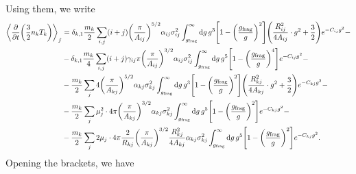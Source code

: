 \documentclass[aps,prl,preprint,groupedaddress,10pt]{revtex4-2}
\begin{document}
Using them, we write
\begin{equation}
    \begin{split}
        \avg{\pdv{t}\pqty{\frac{3}{2}n_kT_k}}_f&=\delta_{k,1}\frac{m_k}{2}
        \sum_{i,j}(i+j)\pqty{\frac{\pi}{A_{ij}}}^{5/2}\alpha_{ij}\sigma_{ij}^2
        \int_{\ltx{g}{frag}}^{\infty}
        \dd{g}g^3\bqty{1-\pqty{\frac{\ltx{g}{frag}}{g}}^2}
        \pqty{\frac{R_{ij}^2}{4A_{ij}}\cdot g^2+\frac{3}{2}}e^{-C_{ij}g^2}-\\
        &-\delta_{k,1}\frac{m_k}{4}
        \sum_{i,j}(i+j)\gamma_{ij}\pi\pqty{\frac{\pi}{A_{ij}}}^{3/2}
        \alpha_{ij}\sigma_{ij}^2\int_{\ltx{g}{frag}}^{\infty}
        \dd{g}g^5\bqty{1-\pqty{\frac{\ltx{g}{frag}}{g}}^4}e^{-C_{ij}g^2}-\\
        &-\frac{m_k}{2}\sum_{j}4\pqty{\frac{\pi}{A_{kj}}}^{5/2}\alpha_{kj}
        \sigma_{kj}^2\int_{\ltx{g}{frag}}^{\infty}
        \dd{g}g^3\bqty{1-\pqty{\frac{\ltx{g}{frag}}{g}}^2}
        \pqty{\frac{R_{kj}^2}{4A_{kj}}\cdot g^2+\frac{3}{2}}e^{-C_{kj}g^2}-\\
        &-\frac{m_k}{2}\sum_{j}\mu_j^2\cdot4\pi\pqty{\frac{\pi}{A_{kj}}}^{3/2}
        \alpha_{kj}\sigma_{kj}^2
        \int_{\ltx{g}{frag}}^{\infty}\dd{g}g^5
        \bqty{1-\pqty{\frac{\ltx{g}{frag}}{g}}^2}e^{-C_{kj}g^2}-\\
        &-\frac{m_k}{2}\sum_{j}2\mu_j\cdot4\pi\frac{2}{R_{kj}}
        \pqty{\frac{\pi}{A_{kj}}}^{3/2}\frac{R_{kj}^2}{4A_{kj}}\alpha_{kj}\sigma_{kj}^2
        \int_{\ltx{g}{frag}}^{\infty}
        \dd{g}g^5\bqty{1-\pqty{\frac{\ltx{g}{frag}}{g}}^2}e^{-C_{kj}g^2}.
    \end{split}
\end{equation}
Opening the brackets, we have
\end{document}
